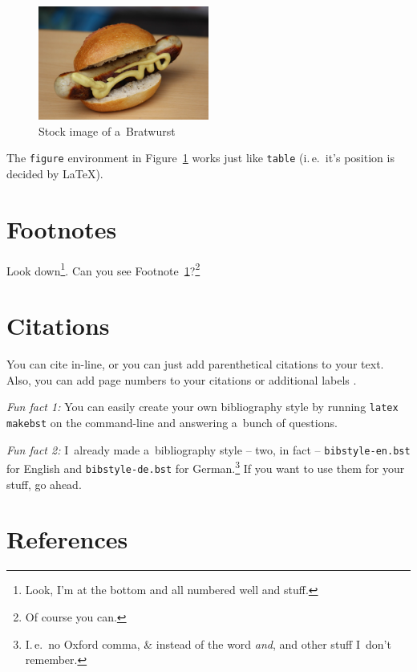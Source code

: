 \documentclass{scrartcl}
\begin{document}
\begin{figure}[h]
  \centering%
  \includegraphics[width=0.5\textwidth]{images/bratwurst.jpg}
  \caption{Stock image of a~Bratwurst}
  \label{fig:wurst}
\end{figure}

The \texttt{figure} environment in Figure~\ref{fig:wurst} works just like
\texttt{table} (i.\,e.\ it's position is decided by \LaTeX).

\section{Footnotes}

Look down\footnote{
  \label{fn:my-footnote}
  Look, I'm at the bottom and all numbered well and stuff.
}.
Can you see Footnote~\ref{fn:my-footnote}?\footnote{
  Of course you can.
}

\section{Citations}

You can cite \citet{smith:2023} in-line, or you can just add parenthetical
citations \citep{muellerlapinsky:1986} to your text.
Also, you can add page numbers to your citations \citep[13--14]{actonetal:1997}
or additional labels \citep[cf.][54]{glargh:2030}.

\emph{Fun fact 1:}
You can easily create your own bibliography style by running \texttt{latex
makebst} on the command-line and answering a~bunch of questions.

\emph{Fun fact 2:}
I~already made a~bibliography style -- two, in fact -- \texttt{bibstyle-en.bst}
for English and \texttt{bibstyle-de.bst} for German.\footnote{%
  I.\,e.\ no Oxford comma, \& instead of the word \emph{and}, and other stuff
  I~don't remember.
}
If you want to use them for your stuff, go ahead.

\section{References}

\end{document}
